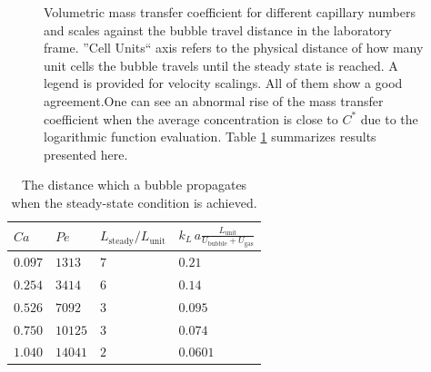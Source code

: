 \documentclass[preprint,12pt]{elsarticle}
\newcommand{\vol}{k_L\,a}
\newcommand{\lunit}{L_{\mathrm{unit}}}
\newcommand{\ububble}{U_{\mathrm{bubble}}}
\newcommand{\ugas}{U_{\mathrm{gas}}}
\newcommand{\cstar}{C^{*}}
\newcommand{\volnondim}{\vol \frac{\lunit}{\ububble+\ugas}}
\begin{document}
\begin{figure}[htb!]
\caption{Volumetric mass transfer coefficient for different capillary numbers and scales against the
bubble travel distance in the laboratory frame. ''Cell Units`` axis refers to the physical
distance of how many unit cells the bubble travels until the steady state is reached. A legend is provided for velocity scalings. All of them show a good agreement.One can see an abnormal rise of the mass transfer coefficient when the average concentration is close to $\cstar$ due to the logarithmic function evaluation.  Table
\ref{table:steady:state:average}
summarizes results presented here.  \label{fig:aver:conc:different:capillaries}}
\end{figure}
\begin{table}[htb!]
\begin{tabularx}{\textwidth}{|X|X|X|X|}
\hline
$Ca$    &$Pe$     &$L_{\mathrm{steady}}/\lunit$& $\volnondim$ \\
\hline
$0.097$ &$1313$  &$7$&$0.21$  \\ 
$0.254$ &$3414$  &$6$&$0.14$  \\ 
$0.526$ &$7092$  &$3$&$0.095$ \\
$0.750$ &$10125$ &$3$&$0.074$ \\
$1.040$ &$14041$ &$2$&$0.0601$\\
\hline
\end{tabularx}
\caption{The distance which a bubble propagates when the
steady-state condition is achieved. 
\label{table:steady:state:average}}
\end{table}
\end{document}
